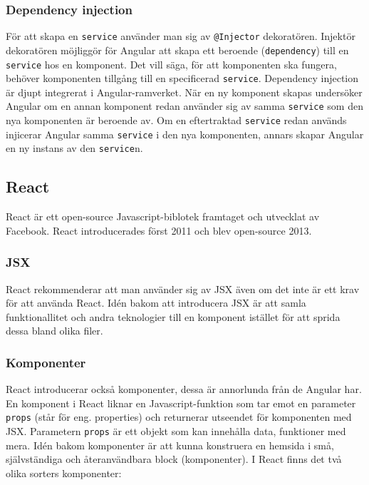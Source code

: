 
\subsubsection{Dependency injection}
För att skapa en \texttt{service} använder man sig av \texttt{@Injector} dekoratören. Injektör dekoratören möjliggör för Angular att skapa ett beroende (\texttt{dependency}) till en \texttt{service}  hos en komponent. Det vill säga, för att komponenten ska fungera, behöver komponenten tillgång till en specificerad \texttt{service}. Dependency injection är djupt integrerat i Angular-ramverket. När en ny komponent skapas undersöker Angular om en annan komponent redan använder sig av samma \texttt{service} som den nya komponenten är beroende av. Om en eftertraktad \texttt{service} redan används injicerar Angular samma \texttt{service} i den nya komponenten, annars skapar Angular en ny instans av den \texttt{service}n. \cite{angular-services}


\subsection{React}
\label{axel:react}
React är ett open-source Javascript-biblotek framtaget och utvecklat av Facebook. React introducerades först 2011 och blev open-source 2013. \cite{react-date}


\subsubsection{JSX}
React rekommenderar att man använder sig av JSX även om det inte är ett krav för att använda React. Idén bakom att introducera JSX är att samla funktionallitet och andra teknologier till en komponent istället för att sprida dessa bland olika filer. \cite{react-jsx}


\subsubsection{Komponenter}
React introducerar också komponenter, dessa är annorlunda från de Angular har. En komponent i React liknar en Javascript-funktion som tar emot en parameter \texttt{props} (står för eng. properties) och returnerar utseendet för komponenten med JSX. Parametern \texttt{props} är ett objekt som kan innehålla data, funktioner med mera. Idén bakom komponenter är att kunna konstruera en hemsida i små, självständiga och återanvändbara block (komponenter). \cite{react-components} I React finns det två olika sorters komponenter:

